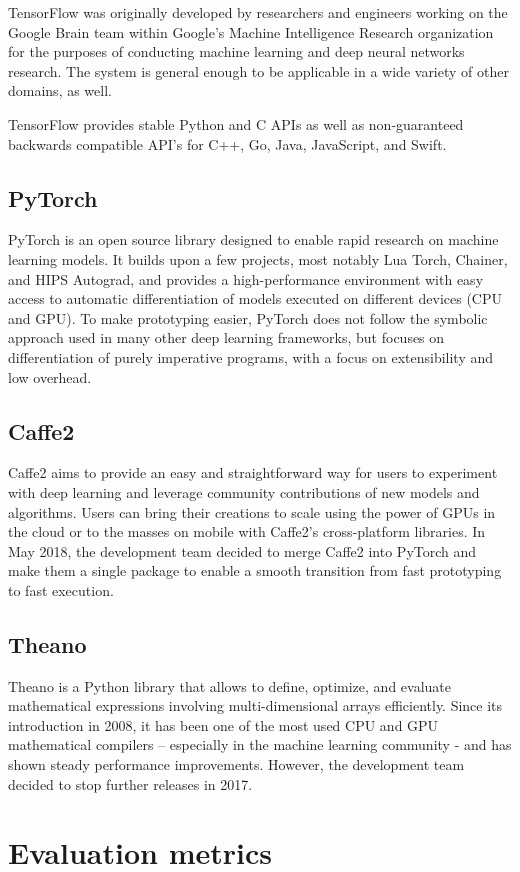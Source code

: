         TensorFlow was originally developed by researchers and engineers working on the Google Brain team within Google's Machine Intelligence Research organization for the purposes of conducting machine learning and deep neural networks research. The system is general enough to be applicable in a wide variety of other domains, as well.

        TensorFlow provides stable Python and C APIs as well as non-guaranteed backwards compatible API's for C++, Go, Java, JavaScript, and Swift. \cite{abadi2016tensorflow}
        
    \subsection{PyTorch}
        PyTorch is an open source library designed to enable rapid research on machine learning models. It builds upon a few projects, most notably Lua Torch, Chainer, and HIPS Autograd, and provides a high-performance environment with easy access to automatic differentiation of models executed on different devices (CPU and GPU). To make prototyping easier, PyTorch does not follow the symbolic approach used in many other deep learning frameworks, but focuses on differentiation of purely imperative programs, with a focus on extensibility and low overhead. \cite{paszke2017automatic}
        
    \subsection{Caffe2}
        Caffe2 aims to provide an easy and straightforward way for users to experiment with deep learning and leverage community contributions of new models and algorithms. Users can bring their creations to scale using the power of GPUs in the cloud or to the masses on mobile with Caffe2's cross-platform libraries. In May 2018, the development team decided to merge Caffe2 into PyTorch and make them a single package to enable a smooth transition from fast prototyping to fast execution. \cite{caffe2}
        
    \subsection{Theano}
        Theano is a Python library that allows to define, optimize, and evaluate mathematical expressions involving multi-dimensional arrays efficiently. Since its introduction in 2008, it has been one of the most used CPU and GPU mathematical compilers – especially in the machine learning community - and has shown steady performance improvements. However, the development team decided to stop further releases in 2017. \cite{2016arXiv160502688short}
        
\section{Evaluation metrics}
   
